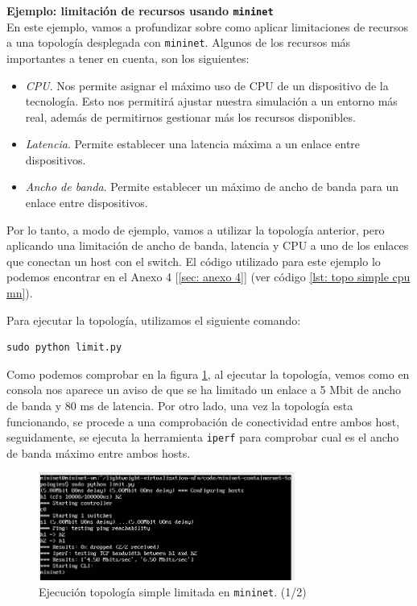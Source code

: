 \documentclass[12pt]{article}
\begin{document}
	
	\noindent \textbf{\large Ejemplo: limitación de recursos usando \texttt{mininet}}\\
	
	\noindent En este ejemplo, vamos a profundizar sobre como aplicar limitaciones de recursos a una topología desplegada con \texttt{mininet}. Algunos de los recursos más importantes a tener en cuenta, son los siguientes:
	
	\begin{itemize}
		\item \textit{CPU}. Nos permite asignar el máximo uso de CPU de un dispositivo de la tecnología. Esto nos permitirá ajustar nuestra simulación a un entorno más real, además de permitirnos gestionar más los recursos disponibles.
		\item \textit{Latencia}. Permite establecer una latencia máxima a un enlace entre dispositivos.
		\item \textit{Ancho de banda}. Permite establecer un máximo de ancho de banda para un enlace entre dispositivos.
	\end{itemize}
	
	\noindent Por lo tanto, a modo de ejemplo, vamos a utilizar la topología anterior, pero aplicando una limitación de ancho de banda, latencia y CPU a uno de los enlaces que conectan un host con el switch. El código utilizado para este ejemplo lo podemos encontrar en el Anexo 4 [\ref{sec: anexo 4}] (ver código \ref{lst: topo simple cpu mn}).
	
	\noindent Para ejecutar la topología, utilizamos el siguiente comando:
	\begin{verbatim}
sudo python limit.py	
	\end{verbatim}

	\noindent Como podemos comprobar en la figura \ref{img: mn limit 1}, al ejecutar la topología, vemos como en consola nos aparece un aviso de que se ha limitado un enlace a 5 Mbit de ancho de banda y 80 ms de latencia. Por otro lado, una vez la topología esta funcionando, se procede a una comprobación de conectividad entre ambos host, seguidamente, se ejecuta la herramienta \texttt{iperf} para comprobar cual es el ancho de banda máximo entre ambos hosts.
	
	\pagebreak
	
	\begin{figure}[h!]
		\begin{center}
			\includegraphics[width=0.75\textwidth]{img/mn_limit_1.png}
			\caption{Ejecución topología simple limitada en \texttt{mininet}. (1/2)}
			\label{img: mn limit 1}	
		\end{center}
	\end{figure}
\end{document}
